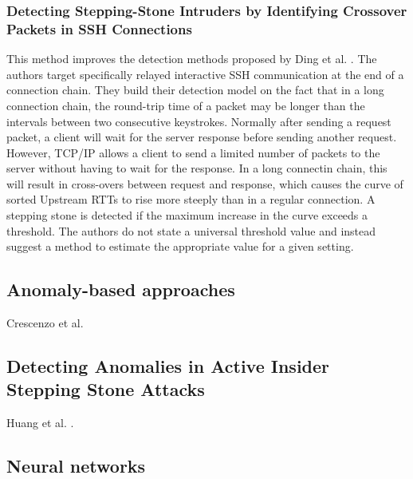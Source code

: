 \documentclass[conference]{IEEEtran}\usepackage[]{graphicx}\usepackage[]{color}
\begin{document}
\subsubsection{Detecting Stepping-Stone Intruders by Identifying Crossover Packets in SSH Connections \cite{huang2016detecting}}

This method improves the detection methods proposed by Ding et al. \cite{ding2009detecting}. The authors target specifically relayed interactive SSH communication at the end of a connection chain. They build their detection model on the fact that in a long connection chain, the round-trip time of a packet may be longer than the intervals between two consecutive keystrokes. Normally after sending a request packet, a client will wait for the server response before sending another request. However, TCP/IP allows a client to send a limited number of packets to the server without having to wait for the response. In a long connectin chain, this will result in cross-overs between request and response, which causes the curve of sorted Upstream RTTs to rise more steeply than in a regular connection. A stepping stone is detected if the maximum increase in the curve exceeds a threshold. The authors do not state a universal threshold value and instead suggest a method to estimate the appropriate value for a given setting.






\subsection{Anomaly-based approaches}

Crescenzo et al. \cite{di2011detecting}
\subsection{Detecting Anomalies in Active Insider Stepping Stone Attacks}

Huang et al. \cite{huang2011detecting}.

\subsection{Neural networks}
\end{document}
